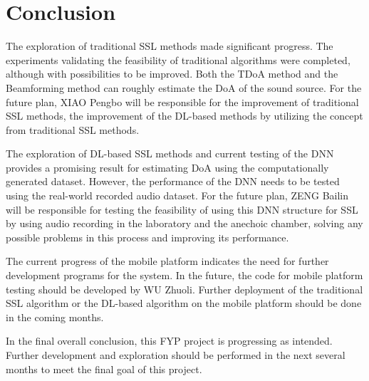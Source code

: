 \chapter*{Conclusion}


The exploration of traditional SSL methods made significant progress. The experiments validating the feasibility of traditional algorithms were completed, although with possibilities to be improved. Both the TDoA method and the Beamforming method can roughly estimate the DoA of the sound source. For the future plan, XIAO Pengbo will be responsible for the improvement of traditional SSL methods, the improvement of the DL-based methods by utilizing the concept from traditional SSL methods.

The exploration of DL-based SSL methods and current testing of the DNN provides a promising result for estimating DoA using the computationally generated dataset. However, the performance of the DNN needs to be tested using the real-world recorded audio dataset. For the future plan, ZENG Bailin will be responsible for testing the feasibility of using this DNN structure for SSL by using audio recording in the laboratory and the anechoic chamber, solving any possible problems in this process and improving its performance.

The current progress of the mobile platform indicates the need for further development programs for the system. In the future, the code for mobile platform testing should be developed by WU Zhuoli. Further deployment of the traditional SSL algorithm or the DL-based algorithm on the mobile platform should be done in the coming months.

In the final overall conclusion, this FYP project is progressing as intended. Further development and exploration should be performed in the next several months to meet the final goal of this project.